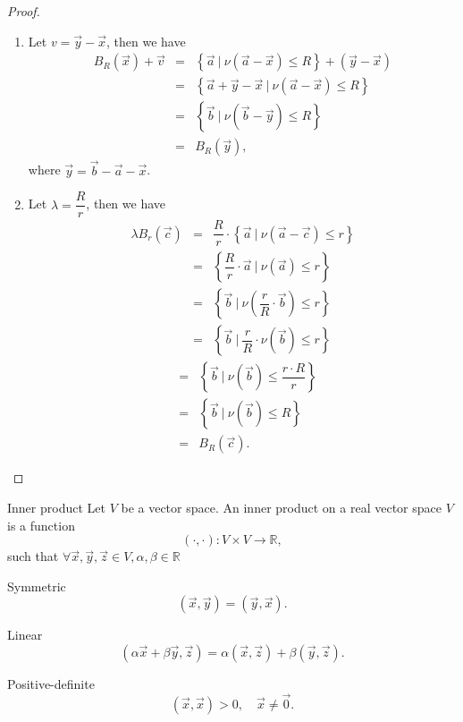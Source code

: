 \begin{proof}
    \begin{enumerate}
        \item Let $v=\vec{y}-\vec{x}$, then we have
        \begin{eqnarray}
               B_R(\vec{x}) + \vec{v} 
               &=& \left\{\vec{a}\ | \ \nu\left(\vec{a} - \vec{x}\right) \leq R\right\} + \left(\vec{y} - \vec{x}\right)  \nonumber\\ 
               &=& \left\{\vec{a} + \vec{y} - \vec{x}\ | \ \nu\left(\vec{a} - \vec{x}\right) \leq R\right\} \nonumber\\
               &=& \left\{\vec{b}\ | \ \nu\left(\vec{b} - \vec{y}\right) \leq R \right\} \nonumber\\
               &=& B_R(\vec{y}), \nonumber
        \end{eqnarray}
        where $\vec{y}= \vec{b} - \vec{a} - \vec{x}$.
        \item Let $\lambda=\dfrac{R}{r}$, then we have
        \begin{eqnarray}    
                 \lambda  B_r(\vec{c}) &=& \dfrac{R}{r}\cdot \left\{\vec{a}\ | \ \nu\left(\vec{a}-\vec{c}\right) \leq r\right\} \nonumber\\
                  &=& \left\{\dfrac{R}{r} \cdot \vec{a} \ | \ \nu\left(\vec{a}\right) \leq r\right\} \nonumber\\
                 &=& \left\{\vec{b}\ | \ \nu\left(\dfrac{r}{R} \cdot \vec{b}\right) \leq r\right\} \nonumber\\
                 &=& \left\{\vec{b}\ | \ \dfrac{r}{R} \cdot \nu \left(\vec{b}\right) \leq r\right\} \nonumber
        \end{eqnarray}
        \begin{eqnarray}           
                 &=& \left\{\vec{b}\ | \ \nu\left(\vec{b}\right) \leq \dfrac{r\cdot R}{r}\right\} \nonumber\\
                  &=&\left\{\vec{b} \ | \ \nu\left(\vec{b}\right) \leq R\right\}\nonumber \\
                &=& B_R(\vec{c}).\nonumber 
        \end{eqnarray}
    \end{enumerate}
\end{proof}
\begin{definition}{Inner product}{}
    Let $V$ be a vector space. An inner product on a real vector space $V$ is a function
    $$
    (\cdot,\cdot): V\times V\rightarrow \mathbb{R},
    $$
    such that $\forall \vec{x},\vec{y},\vec{z}\in V, \alpha,\beta\in\mathbb{R}$    
    \begin{enumerate*}
        \item Symmetric
        \[ 
            (\vec{x},\vec{y})=(\vec{y},\vec{x}).
        \]
        \item Linear \[
            (\alpha\vec{x}+\beta\vec{y},\vec{z})=
            \alpha(\vec{x},\vec{z})+\beta(\vec{y},\vec{z}).
        \]
        \item Positive-definite
        \[ 
            (\vec{x},\vec{x})>0, \quad \vec{x}\neq \vec{0}.
        \]
    \end{enumerate*}
\end{definition}

